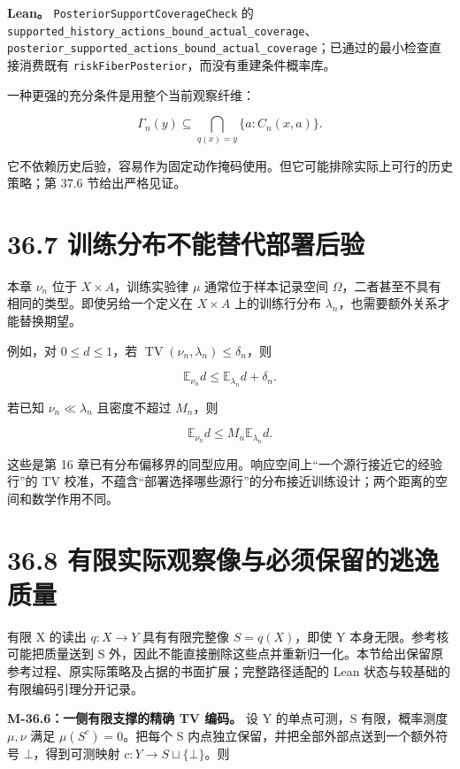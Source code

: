 \documentclass[
  11pt,
  oneside]{book}
\begin{document}
\textbf{Lean。} \nolinkurl{PosteriorSupportCoverageCheck} 的 \nolinkurl{supported_history_actions_bound_actual_coverage}、\nolinkurl{posterior_supported_actions_bound_actual_coverage}；已通过的最小检查直接消费既有 \nolinkurl{riskFiberPosterior}，而没有重建条件概率库。

一种更强的充分条件是用整个当前观察纤维：

\[\Gamma_n(y)\subseteq\bigcap_{q(x)=y}\{a:C_n(x,a)\}.\]

它不依赖历史后验，容易作为固定动作掩码使用。但它可能排除实际上可行的历史策略；第 37.6 节给出严格见证。

\section{36.7 训练分布不能替代部署后验}\label{ux8badux7ec3ux5206ux5e03ux4e0dux80fdux66ffux4ee3ux90e8ux7f72ux540eux9a8c}

本章 \(\nu_n\) 位于 \(X\times A\)，训练实验律 \(\mu\) 通常位于样本记录空间 \(\Omega\)，二者甚至不具有相同的类型。即使另给一个定义在 \(X\times A\) 上的训练行分布 \(\lambda_n\)，也需要额外关系才能替换期望。

例如，对 \(0\le d\le1\)，若 \(\operatorname{TV}(\nu_n,\lambda_n)\le\delta_n\)，则

\[\mathbb E_{\nu_n}d\le\mathbb E_{\lambda_n}d+\delta_n.\]

若已知 \(\nu_n\ll\lambda_n\) 且密度不超过 \(M_n\)，则

\[\mathbb E_{\nu_n}d\le M_n\mathbb E_{\lambda_n}d.\]

这些是第 16 章已有分布偏移界的同型应用。响应空间上``一个源行接近它的经验行''的 TV 校准，不蕴含``部署选择哪些源行''的分布接近训练设计；两个距离的空间和数学作用不同。

\section{36.8 有限实际观察像与必须保留的逃逸质量}\label{ux6709ux9650ux5b9eux9645ux89c2ux5bdfux50cfux4e0eux5fc5ux987bux4fddux7559ux7684ux9003ux9038ux8d28ux91cf}

有限 X 的读出 \(q:X\to Y\) 具有有限完整像 \(S=q(X)\)，即使 Y 本身无限。参考核可能把质量送到 S 外，因此不能直接删除这些点并重新归一化。本节给出保留原参考过程、原实际策略及占据的书面扩展；完整路径适配的 Lean 状态与较基础的有限编码引理分开记录。

\hypertarget{m-36-6}{}\label{m-36-6}

\textbf{M-36.6：一侧有限支撑的精确 TV 编码。} 设 Y 的单点可测，S 有限，概率测度 \(\mu,\nu\) 满足 \(\mu(S^c)=0\)。把每个 S 内点独立保留，并把全部外部点送到一个额外符号 \(\bot\)，得到可测映射 \(c:Y\to S\sqcup\{\bot\}\)。则
\end{document}
